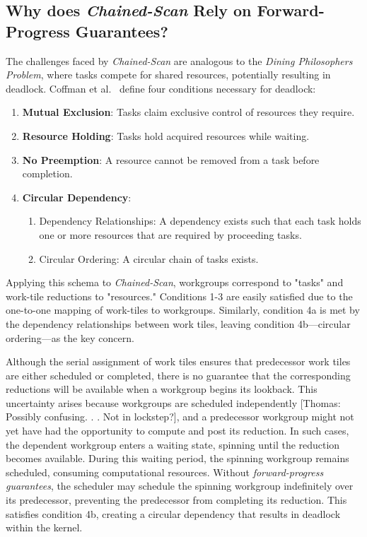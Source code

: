 \documentclass[sigconf]{acmart}
\newcommand{\thomas}[1]{{\footnotesize\color{orange}[Thomas: #1]}}
\begin{document}
\subsection{Why does \emph{Chained-Scan} Rely on Forward-Progress Guarantees?}
The challenges faced by \emph{Chained-Scan} are analogous to the \emph{Dining Philosophers Problem}, where tasks compete for shared resources, potentially resulting in deadlock. Coffman et al.~\cite{10.1145/356586.356588} define four conditions necessary for deadlock:
\begin{enumerate}
  \item \textbf{Mutual Exclusion}: Tasks claim exclusive control of resources they require.
  \item \textbf{Resource Holding}: Tasks hold acquired resources while waiting.
  \item \textbf{No Preemption}: A resource cannot be removed from a task before completion.
  \item \textbf{Circular Dependency}:
  \begin{enumerate}
    \item Dependency Relationships: A dependency exists such that each task holds one or more resources that are required by proceeding tasks.
    \item Circular Ordering: A circular chain of tasks exists.
  \end{enumerate}
\end{enumerate}
Applying this schema to \emph{Chained-Scan}, workgroups correspond to "tasks" and work-tile reductions to "resources." Conditions 1-3 are easily satisfied due to the one-to-one mapping of work-tiles to workgroups. Similarly, condition 4a is met by the dependency relationships between work tiles, leaving condition 4b---circular ordering---as the key concern.

Although the serial assignment of work tiles ensures that predecessor work tiles are either scheduled or completed, there is no guarantee that the corresponding reductions will be available when a workgroup begins its lookback. This uncertainty arises because workgroups are scheduled independently \thomas{Possibly confusing. . . Not in lockstep?}, and a predecessor workgroup might not yet have had the opportunity to compute and post its reduction. In such cases, the dependent workgroup enters a waiting state, spinning until the reduction becomes available. During this waiting period, the spinning workgroup remains scheduled, consuming computational resources. Without \emph{forward-progress guarantees}, the scheduler may schedule the spinning workgroup indefinitely over its predecessor, preventing the predecessor from completing its reduction. This satisfies condition 4b, creating a circular dependency that results in deadlock within the kernel.
\end{document}
